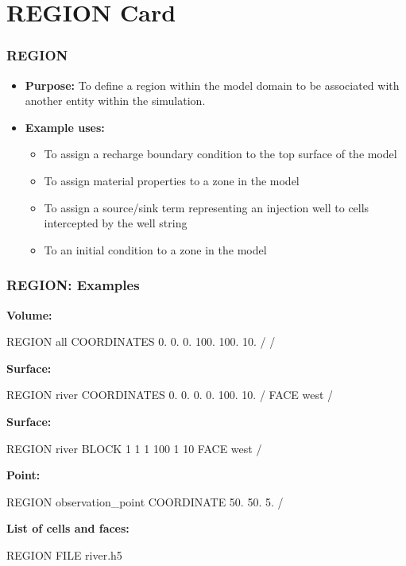 \section{REGION Card}

\begin{frame}\frametitle{REGION}

\begin{itemize}{}
\item[] \textbf{Purpose:} To define a region within the model domain to be associated with another entity within the simulation.
\item[] \textbf{Example uses:}
\begin{itemize}
  \item To assign a recharge boundary condition to the top surface of the model
  \item To assign material properties to a zone in the model
  \item To assign a source/sink term representing an injection well to cells intercepted by the well string
  \item To an initial condition to a zone in the model
\end{itemize}
\end{itemize}

\end{frame}


\begin{frame}[fragile]\frametitle{REGION: Examples}

\scriptsize
\begin{multicols}{2}

\textbf{Volume:}
\begin{semiverbatim}
REGION all
  COORDINATES
    0. 0. 0.
    100. 100. 10.
  /
/
\end{semiverbatim}
\textbf{Surface:}
\begin{semiverbatim}
REGION river
  COORDINATES
    0. 0. 0.
    0. 100. 10.
  /
  FACE west
/
\end{semiverbatim}

\textbf{Surface:}
\begin{semiverbatim}
REGION river
  BLOCK 1 1 1 100 1 10
  FACE west
/
\end{semiverbatim}

\textbf{Point:}
\begin{semiverbatim}
REGION observation_point
  COORDINATE 50. 50. 5.
/
\end{semiverbatim}

\textbf{List of cells and faces:}
\begin{semiverbatim}
REGION FILE river.h5
\end{semiverbatim}


\end{multicols}

\end{frame}
